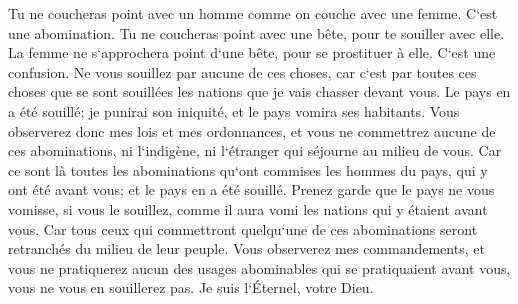 \verse Tu ne coucheras point avec un homme comme on couche avec une femme. C`est une abomination. 
\verse Tu ne coucheras point avec une bête, pour te souiller avec elle. La femme ne s`approchera point d`une bête, pour se prostituer à elle. C`est une confusion. 
\verse Ne vous souillez par aucune de ces choses, car c`est par toutes ces choses que se sont souillées les nations que je vais chasser devant vous. 
\verse Le pays en a été souillé; je punirai son iniquité, et le pays vomira ses habitants. 
\verse Vous observerez donc mes lois et mes ordonnances, et vous ne commettrez aucune de ces abominations, ni l`indigène, ni l`étranger qui séjourne au milieu de vous. 
\verse Car ce sont là toutes les abominations qu`ont commises les hommes du pays, qui y ont été avant vous; et le pays en a été souillé. 
\verse Prenez garde que le pays ne vous vomisse, si vous le souillez, comme il aura vomi les nations qui y étaient avant vous. 
\verse Car tous ceux qui commettront quelqu`une de ces abominations seront retranchés du milieu de leur peuple. 
\verse Vous observerez mes commandements, et vous ne pratiquerez aucun des usages abominables qui se pratiquaient avant vous, vous ne vous en souillerez pas. Je suis l`Éternel, votre Dieu. 


